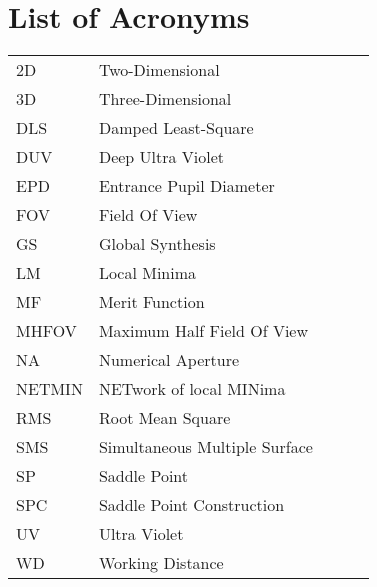 \chapter*{List of Acronyms} %
\label{glossaries} %

\begin{table}[!h]
\begin{tabular}{lllll}
2D     & Two-Dimensional               &  &  &  \\
3D     & Three-Dimensional             &  &  &  \\
DLS    & Damped Least-Square           &  &  &  \\
DUV    & Deep Ultra Violet             &  &  &  \\
EPD    & Entrance Pupil Diameter       &  &  &  \\
FOV    & Field Of View                 &  &  &  \\
GS     & Global Synthesis              &  &  &  \\
LM     & Local Minima                  &  &  &  \\
MF     & Merit Function                &  &  &  \\
MHFOV  & Maximum Half Field Of View    &  &  &  \\
NA     & Numerical Aperture            &  &  &  \\
NETMIN & NETwork of local MINima       &  &  &  \\
RMS    & Root Mean Square              &  &  &  \\
SMS    & Simultaneous Multiple Surface &  &  &  \\
SP     & Saddle Point                  &  &  &  \\
SPC    & Saddle Point Construction     &  &  &  \\
UV     & Ultra Violet                  &  &  &  \\
WD     & Working Distance              &  &  & 
\end{tabular}
\end{table}











